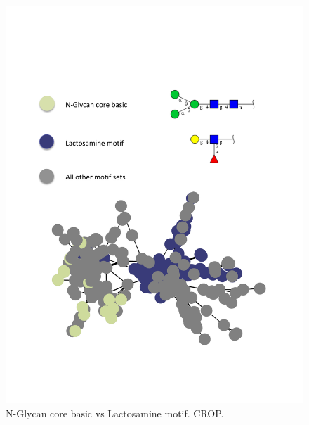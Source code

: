 \documentclass[12pt,a4paper]{article}
\begin{document}
\begin{figure}[H]
\centering 
\includegraphics[scale=0.9]{motif_similarity_exploration/N-Glycan_core_basic_vs_Lactosamine_motif.pdf} 
\caption{N-Glycan core basic vs Lactosamine motif. CROP.}
\label{fig:N-Glycan_core_basic_vs_Lactosamine_motif}
\end{figure}
\end{document}
